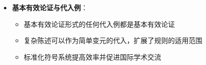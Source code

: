 \begin{center}
{{\begin{itemize}
\begin{itemize}
  \item 现代形式化：19-20世纪的符号逻辑体系
  \item 计算机应用：自动定理证明和专家系统的基础
  \end{itemize}
\item \textbf{基本有效论证与代入例}：
  \begin{itemize}
  \item 基本有效论证形式的任何代入例都是基本有效论证
  \item 复杂陈述可以作为简单变元的代入，扩展了规则的适用范围
  \item 标准化符号系统提高效率并促进国际学术交流
  \end{itemize}
\end{itemize}
}}
\end{center}